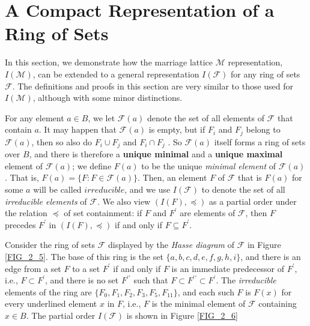 \section{A Compact Representation of a Ring of Sets}

In this section, we demonstrate how the marriage lattice $\mathcal{M}$ representation, $I(\mathcal{M})$, can be extended to a general representation $I(\mathcal{F})$ for any ring of sets $\mathcal{F}$. The definitions and proofs in this section are very similar to those used for $I(\mathcal{M})$, although with some minor distinctions.

For any element $a \in B$, we let $\mathcal{F}(a)$ denote the set of all elements of $\mathcal{F}$ that contain $a$. It may happen that $\mathcal{F}(a)$ is empty, but if $F_i$ and $F_j$ belong to $\mathcal{F}(a)$, then so also do $F_i \cup F_j$ and $F_i \cap F_j$ . So $\mathcal{F}(a)$ itself forms a ring of sets over $B$, and there is therefore a \textbf{unique minimal} and a \textbf{unique maximal} element of $\mathcal{F}(a)$; we define $F(a)$ to be the unique \textit{minimal element} of $\mathcal{F}(a)$. That is, $F(a) = \{F : F \in \mathcal{F}(a)\}$. Then, an element $F$ of $\mathcal{F}$ that is $F(a)$ for some $a$ will be called $irreducible$, and we use $I(\mathcal{F})$ to denote the set of all \textit{irreducible elements} of $\mathcal{F}$. We also view $(I(F), \preceq)$ as a partial order under the relation $\preceq$ of set containment: if $F$ and $F^\prime$ are elements of $\mathcal{F}$, then $F$ precedes $F^\prime$ in $(I(F),\preceq)$ if and only if $F \subseteq F^\prime$.

\begin{exmp}\label{exmp_2_5}
 Consider the ring of sets $\mathcal{F}$ displayed by the \textit{Hasse diagram} of $\mathcal{F}$ in Figure \ref{FIG_2_5}. The base of this ring is the set $\{a, b, c, d, e, f, g, h, i\}$, and there is an edge from a set $F$ to a set $F^\prime$ if and only if $F$ is an immediate predecessor of $F^\prime$, i.e., $F \subset F^\prime$, and there is no set $F^{\prime \prime}$ such that $F \subset F^{\prime \prime} \subset F^\prime$. The \textit{irreducible} elements of the ring are $\{F_0, F_1, F_2, F_3, F_5, F_{11}\}$, and each such $F$ is $F(x)$ for every underlined element $x$ in $F$, i.e., $F$ is the minimal element of $\mathcal{F}$ containing $x \in B$. The partial order $I(\mathcal{F})$ is shown in Figure \ref{FIG_2_6}
\end{exmp}

